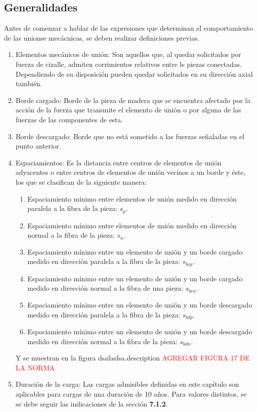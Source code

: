 \subsection{Generalidades}
Antes de comenzar a hablar de las expresiones que determinan el comportamiento de las unionse mecácnicas, se deben realizar definiciones previas. 
\begin{enumerate}
		\item Elementos mecánicos de unión: Son aquellos que, al quedar solicitados por fuerza de cizalle, admiten corrimientos relativos entre ls piezas conectadas. Dependiendo de su disposición pueden quedar solicitados en su dirección axial también.
		\item Borde cargado: Borde de la pieza de madera que se encuentra afectado por la acción de la fuerza que transmite el elemento de unión o por alguna de las fuerzas de las componentes de esta.
		\item Borde descargado: Borde que no está sometido a las fuerzas señaladas en el punto anterior.
		\item Espaciamientos: Es la distancia entre centros de elementos de unión adyacentes o entre centros de elementos de unión vecinos a un borde y éste, los que se clasifican de la siguiente manera:
		\begin{enumerate}
			\item Espaciamiento mínimo entre elementos de unión medido en dirección paralela a la fibra de la pieza: $s_p$.
			\item Espaciamiento mínimo entre elementos de unión medido en dirección normal a la fibra de la pieza: $s_n$.
			\item Espaciamiento mínimo entre un elemento de unión y un borde cargado medido en dirección paralela a la fibra de la pieza: $s_{bcp}$.
			\item Espaciamiento mínimo entre un elemento de unión y un borde cargado medido en dirección normal a la fibra de una pieza: $s_{bcn}$.
			\item Espaciamiento mínimo entre un elemento de unión y un borde descargado medido en dirección paralela a la fibra de la pieza: $s_{bdp}$.
			\item Espaciamiento mínimo entre un elemento de unión y un borde descargado medido en dirección normal a la fibra de la pieza: $s_{bdn}$.
		\end{enumerate}
		Y se muestran en la figura dsafasfsa.description \textcolor{red}{AGREGAR FIGURA 17 DE LA NORMA}
		\item Duración de la carga: Las cargas admisibles definidas en este capítulo son aplicables para cargas de una duración de 10 años. Para valores distintos, se se debe seguir las indicaciones de la sección \textbf{7.1.2}.

\end{enumerate}
